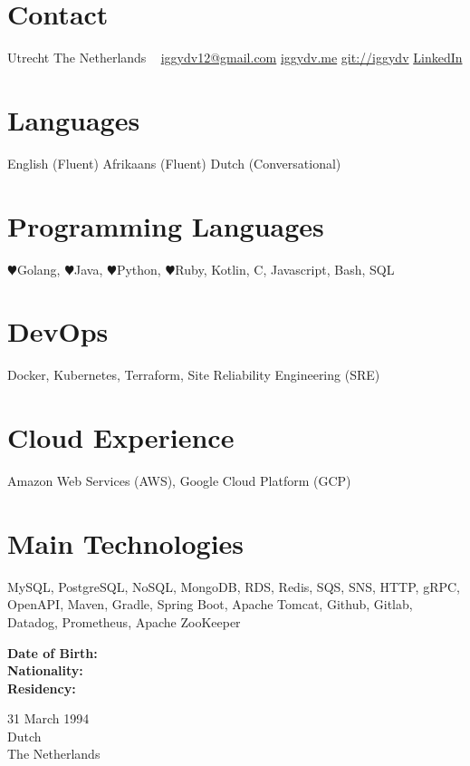 \documentclass[10pt]{friggeri-cv} %
\begin{document}
\begin{aside} %
\section{Contact}
Utrecht
The Netherlands
~
\href{iggydv12@gmail.com}{iggydv12@gmail.com}
\href{https://iggydv.me}{iggydv.me} \faGlobe
\href{https://github.com/iggydv}{git://iggydv} \faGithub
\href{https://www.linkedin.com/in/ignatius-de-villiers-11324b133}{LinkedIn} \faLinkedin
\section{Languages}
English (Fluent)
Afrikaans (Fluent)
Dutch (Conversational)
\section{Programming Languages}
{\color{blue} $\varheartsuit$}Golang, {\color{purple} $\varheartsuit$}Java, {\color{green} $\varheartsuit$}Python, {\color{orange} $\varheartsuit$}Ruby, Kotlin, C, Javascript, Bash, SQL
\section{DevOps}
Docker, Kubernetes, Terraform, Site Reliability Engineering (SRE)
\section{Cloud Experience}
Amazon Web Services (AWS), Google Cloud Platform (GCP) 
\section{Main Technologies}
MySQL, PostgreSQL, NoSQL, MongoDB, RDS, Redis, SQS, SNS, HTTP, gRPC, OpenAPI, Maven, Gradle, Spring Boot, Apache Tomcat, Github, Gitlab, Datadog, Prometheus, Apache ZooKeeper
\end{aside}
\newline
\begin{minipage}[t]{0.2\textwidth}
    \textbf{Date of Birth:}\\
    \textbf{Nationality:}\\
    \textbf{Residency:}\\
\end{minipage}%
%
\begin{minipage}[t]{0.5\textwidth}
    31 March 1994\\
    Dutch\\
    The Netherlands
\end{minipage}%
\newline
\end{document}

